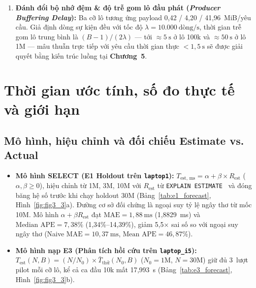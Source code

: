 \documentclass[13pt,a4paper]{report}
\begin{document}
\begin{enumerate}
    \item \textbf{Đánh đổi bộ nhớ đệm \& độ trễ gom lô đầu phát (\textit{Producer Buffering Delay}):} Ba cỡ lô tương ứng payload 0,42 / 4,20 / 41,96~MiB/yêu cầu. Giả định dòng sự kiện đều với tốc độ $\lambda = 10.000~\text{dòng/s}$, thời gian trễ gom lô trung bình là $(B - 1)/(2\lambda)$ --- tới $\approx 5~\text{s}$ ở lô 100k và $\approx 50~\text{s}$ ở lô 1M --- mâu thuẫn trực tiếp với yêu cầu thời gian thực $< 1{,}5~\text{s}$ sẽ được giải quyết bằng kiến trúc luồng tại \textbf{Chương~5}.
\end{enumerate}

\section{Thời gian ước tính, số đo thực tế và giới hạn}

\subsection{Mô hình, hiệu chỉnh và đối chiếu Estimate vs. Actual}
\begin{itemize}
    \setlength{\itemsep}{3pt}
    \setlength{\parskip}{0pt}
    \setlength{\parsep}{0pt}
    \item \textbf{Mô hình SELECT (E1 Holdout trên \texttt{laptop1}):} $T_{\text{est, ms}} = \alpha + \beta \times R_{\text{est}}$ ($\alpha, \beta \ge 0$), hiệu chỉnh từ 1M, 3M, 10M với $R_{\text{est}}$ từ \texttt{EXPLAIN ESTIMATE}~\cite{S7} và đóng băng hệ số trước khi chạy holdout 30M (Bảng~\ref{tab:e1_forecast}, Hình~\ref{fig:fig3_3}a). Đường cơ sở đối chứng là ngoại suy tỷ lệ ngây thơ từ mốc 10M. Mô hình $\alpha + \beta R_{\text{est}}$ đạt $\text{MAE} = 1{,}88~\text{ms}$ (1,8829~ms) và $\text{Median APE} = 7{,}38\%$ (1,34\%--14,39\%), giảm 5,5${\times}$ sai số so với ngoại suy ngây thơ (Naive $\text{MAE} = 10{,}37~\text{ms}$, $\text{Mean APE} = 46{,}87\%$).
    \item \textbf{Mô hình nạp E3 (Phân tích hồi cứu trên \texttt{laptop\_\allowbreak{}i5}):} $T_{\text{est}}(N, B) = (N / N_0) \times \bar{T}_{\text{thử}}(N_0, B)$ ($N_0 = 1\text{M}$, $N = 30\text{M}$) giữ đủ 3~lượt pilot mỗi cỡ lô, kể cả ca đầu 10k mất 17,993~s (Bảng~\ref{tab:e3_forecast}, Hình~\ref{fig:fig3_3}b).
\end{itemize}
\end{document}
